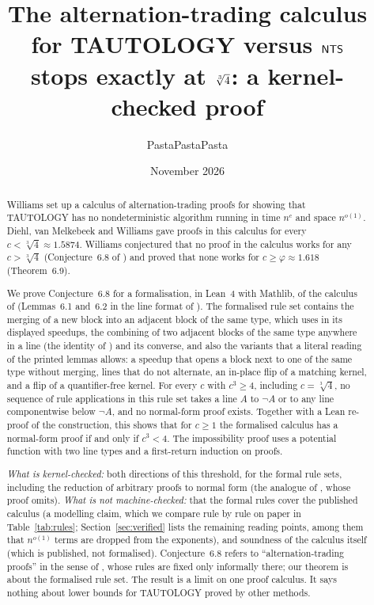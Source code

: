 \documentclass[11pt]{article}
\title{The alternation-trading calculus for TAUTOLOGY versus $\mathsf{NTS}$\\ stops exactly at $\cbrt$: a kernel-checked proof}
\author{PastaPastaPasta}
\date{November 2026}
\theoremstyle{definition}
\newcommand{\cbrt}{\sqrt[3]{4}}
\begin{document}
\maketitle

\begin{abstract}
Williams \cite[\S6]{W13} set up a calculus of alternation-trading proofs for showing that
TAUTOLOGY has no nondeterministic algorithm running in time $n^c$ and space $n^{o(1)}$.
Diehl, van Melkebeek and Williams \cite{DvMW11} gave proofs in this calculus for every $c<\cbrt\approx 1.5874$.
Williams conjectured that no proof in the calculus works for any $c>\cbrt$ (Conjecture~6.8 of \cite{W13}) and proved that none works for $c\ge\varphi\approx 1.618$ (Theorem~6.9).

We prove Conjecture~6.8 for a formalisation, in Lean~4 with Mathlib, of the calculus of \cite[\S6]{W13} (Lemmas~6.1 and~6.2 in the line format of \cite[\S2]{W13}). The formalised rule set contains the merging of a new block into an adjacent block of the same type, which \cite{W13} uses in its displayed speedups, the combining of two adjacent blocks of the same type anywhere in a line (the identity of \cite[\S2]{W13}) and its converse, and also the variants that a literal reading of the printed lemmas allows: a speedup that opens a block next to one of the same type without merging, lines that do not alternate, an in-place flip of a matching kernel, and a flip of a quantifier-free kernel. For every $c$ with $c^3\ge 4$, including $c=\cbrt$, no sequence of rule applications in this rule set takes a line $A$ to $\neg A$ or to any line componentwise below $\neg A$, and no normal-form proof exists. Together with a Lean re-proof of the \cite{DvMW11} construction, this shows that for $c\ge 1$ the formalised calculus has a normal-form proof if and only if $c^3<4$. The impossibility proof uses a potential function with two line types and a first-return induction on proofs.

\emph{What is kernel-checked:} both directions of this threshold, for the formal rule sets, including the reduction of arbitrary proofs to normal form (the analogue of \cite[Theorem~6.6]{W13}, whose proof \cite{W13} omits).
\emph{What is not machine-checked:} that the formal rules cover the published calculus (a modelling claim, which we compare rule by rule on paper in Table~\ref{tab:rules}; Section~\ref{sec:verified} lists the remaining reading points, among them that $n^{o(1)}$ terms are dropped from the exponents), and soundness of the calculus itself (which is published, not formalised). Conjecture~6.8 refers to ``alternation-trading proofs'' in the sense of \cite{W13}, whose rules are fixed only informally there; our theorem is about the formalised rule set. The result is a limit on one proof calculus. It says nothing about lower bounds for TAUTOLOGY proved by other methods.
\end{abstract}
\end{document}
